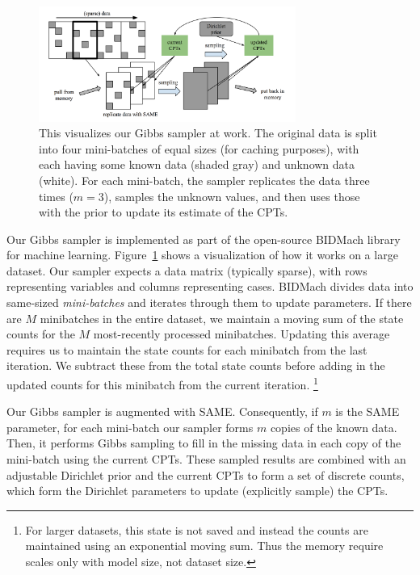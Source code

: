 \documentclass{article} %
\begin{document}
\begin{figure}[t]
\centering
\includegraphics[width=0.75\textwidth]{fig_BIDMach_final}
\caption{This visualizes our Gibbs sampler at work. The original data is split into four
mini-batches of equal sizes (for caching purposes), with each having some known data (shaded gray)
and unknown data (white). For each mini-batch, the sampler replicates the data three times ($m=3$),
samples the unknown values, and then uses those with the prior to update its estimate of the CPTs.}
\label{fig:BIDMach}
\end{figure}

Our Gibbs sampler is implemented as part of the open-source BIDMach library~\citep{bidmach} for
machine learning.  Figure~\ref{fig:BIDMach} shows a visualization of how it works on a large dataset.
Our sampler expects a data matrix (typically sparse), with rows representing variables and columns
representing cases. BIDMach divides data into same-sized \emph{mini-batches} and iterates through
them to update parameters. If there are $M$ minibatches in the entire dataset, we maintain a moving
sum of the state counts for the $M$ most-recently processed minibatches. Updating this average requires 
us to maintain the state counts for each minibatch from the last iteration. We subtract these from
the total state counts before adding in the updated counts for this minibatch from the current iteration.
\footnote{For larger
datasets, this state is not saved and instead the counts are maintained using an exponential moving sum. Thus the memory require scales only with model size, not dataset size.}

Our Gibbs sampler is augmented with SAME. Consequently, if $m$ is the SAME parameter, for each
mini-batch our sampler forms $m$ copies of the known data.  Then, it performs Gibbs sampling to fill
in the missing data in each copy of the mini-batch using the current CPTs.  These sampled results
are combined with an adjustable Dirichlet prior and the current CPTs to form a set of discrete
counts, which form the Dirichlet parameters to update (explicitly sample) the CPTs. 
\end{document}

